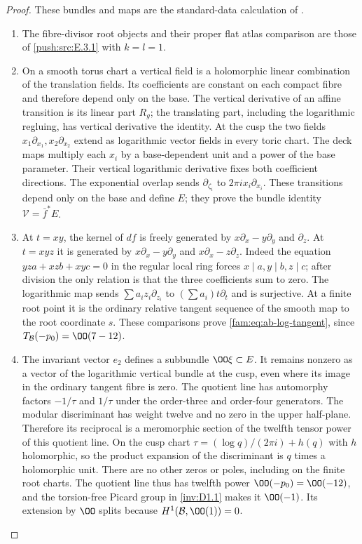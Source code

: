 \begin{proof}
These bundles and maps are the standard-data calculation of
\cite[Lemma~6.2, pp.~74--75; Lemma~6.7, p.~78; Proposition~6.6, p.~77; Proposition~6.10, pp.~79--80]{DuEtAl2026v1}.
\begin{enumerate}[label=\arabic*.,leftmargin=*]
\item The fibre-divisor root objects and their proper flat
atlas comparison are those of \cref{push:src:E.3.1} with $k=l=1$.
\item On a smooth torus chart a vertical field is a holomorphic linear
combination of the translation fields. Its coefficients are constant
on each compact fibre and therefore depend only on the base. The
vertical derivative of an affine transition is its linear part $R_g$;
the translating part, including the logarithmic regluing, has vertical
derivative the identity. At the cusp the two fields
$x_1\partial_{x_1},x_2\partial_{x_2}$ extend as logarithmic vector
fields in every toric chart. The deck maps multiply each $x_i$ by a
base-dependent unit and a power of the base parameter. Their vertical
logarithmic derivative fixes both coefficient directions. The
exponential overlap sends $\partial_{\zeta_i}$ to
$2\pi i x_i\partial_{x_i}$. These transitions depend only on the base
and define $E$; they prove the bundle identity
$\mathcal V=\bar f^*E$.

\item At
$t=xy$, the kernel of $df$ is freely generated by
$x\partial_x-y\partial_y$ and $\partial_z$. At $t=xyz$ it is generated
by $x\partial_x-y\partial_y$ and $x\partial_x-z\partial_z$.
Indeed the equation $yz a+xz b+xy c=0$ in the regular local ring forces
$x\mid a,y\mid b,z\mid c$; after division the only relation is that
the three coefficients sum to zero. The logarithmic map sends
$\sum a_i z_i\partial_{z_i}$ to $(\sum a_i)t\partial_t$ and is
surjective. At a finite root point it is the ordinary relative tangent
sequence of the smooth map to the root coordinate $s$. These comparisons prove \eqref{fam:eq:ab-log-tangent}, since
$T_{\mathcal B}(-p_0)=\OO(7-12)$.

\item The invariant vector $e_2$ defines a subbundle $\OO\xi\subset E$.
It remains nonzero as a vector of the logarithmic vertical bundle at
the cusp, even where its image in the ordinary tangent fibre is zero.
The quotient line has automorphy factors $-1/\tau$ and $1/\tau$ under
the order-three and order-four generators. The modular discriminant
has weight twelve and no zero in the upper half-plane. Therefore its
reciprocal is a meromorphic section of the twelfth tensor power of
this quotient line. On the cusp chart
$\tau=(\log q)/(2\pi i)+h(q)$ with $h$ holomorphic, so the product
expansion of the discriminant is $q$ times a holomorphic unit.
There are no other zeros or poles, including on the finite root
charts. The quotient line thus has twelfth power
$\OO(-p_0)=\OO(-12)$, and the torsion-free Picard group in \ref{inv:D1.1} makes
it $\OO(-1)$. Its extension by $\OO$ splits because
$H^1(\mathcal B,\OO(1))=0$.


\end{enumerate}
\end{proof}
